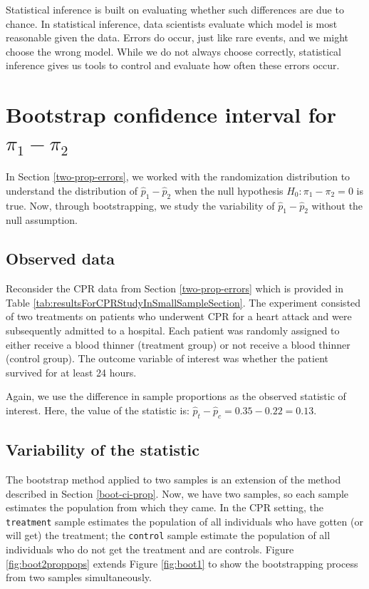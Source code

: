 \documentclass[
  10pt,
  openany]{book}
\theoremstyle{definition}
\theoremstyle{definition}
\theoremstyle{definition}
\theoremstyle{definition}
\theoremstyle{remark}
\begin{document}

Statistical inference is built on evaluating whether such differences are due to chance. In statistical inference, data scientists evaluate which model is most reasonable given the data. Errors do occur, just like rare events, and we might choose the wrong model. While we do not always choose correctly, statistical inference gives us tools to control and evaluate how often these errors occur.

\section{\texorpdfstring{Bootstrap confidence interval for \(\pi_1 - \pi_2\)}{Bootstrap confidence interval for \textbackslash pi\_1 - \textbackslash pi\_2}}\label{two-prop-boot-ci}

In Section \ref{two-prop-errors}, we worked with the randomization distribution to understand the distribution of \(\hat{p}_1 - \hat{p}_2\) when the null hypothesis \(H_0: \pi_1 - \pi_2 = 0\) is true. Now, through bootstrapping, we study the variability of \(\hat{p}_1 - \hat{p}_2\) without the null assumption.

\subsection{Observed data}\label{observed-data-3}

Reconsider the CPR data from Section \ref{two-prop-errors} which is provided in Table \ref{tab:resultsForCPRStudyInSmallSampleSection}. The experiment consisted of two treatments on patients who underwent CPR for a heart attack and were subsequently admitted to a hospital. Each patient was randomly assigned to either receive a blood thinner (treatment group) or not receive a blood thinner (control group). The outcome variable of interest was whether the patient survived for at least 24 hours.

Again, we use the difference in sample proportions as the observed statistic of interest. Here, the value of the statistic is: \(\hat{p}_t - \hat{p}_c = 0.35 - 0.22 = 0.13\).

\subsection{Variability of the statistic}\label{variability-of-the-statistic-2}

The bootstrap method applied to two samples is an extension of the method described in Section \ref{boot-ci-prop}. Now, we have two samples, so each sample estimates the population from which they came. In the CPR setting, the \texttt{treatment} sample estimates the population of all individuals who have gotten (or will get) the treatment; the \texttt{control} sample estimate the population of all individuals who do not get the treatment and are controls. Figure \ref{fig:boot2proppops} extends Figure \ref{fig:boot1} to show the bootstrapping process from two samples simultaneously.
\end{document}
